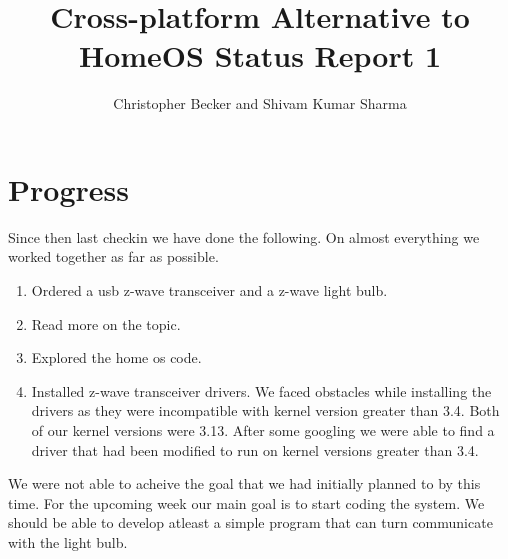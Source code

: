 \documentclass[letterpaper,12pt]{article}
\title{Cross-platform Alternative to HomeOS Status Report 1}
\author{Christopher Becker and Shivam Kumar Sharma}
\begin{document}
\maketitle

\section*{Progress}
Since then last checkin we have done the following. On almost everything we worked together as far as possible.
\begin{enumerate}
 \item Ordered a usb z-wave transceiver and a z-wave light bulb.
 \item Read more on the topic.
 \item Explored the home os code.
 \item Installed z-wave transceiver drivers. We faced obstacles while installing the drivers as they were incompatible with kernel version greater than 3.4. Both of our kernel versions were 3.13. After some googling we were able to find a driver that had been modified to run on kernel versions greater than 3.4.
\end{enumerate}
We were not able to acheive the goal that we had initially planned to by this time.
For the upcoming week our main goal is to start coding the system. We should be able to develop atleast a simple program that can turn communicate with the light bulb.
\end{document}
